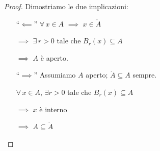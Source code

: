 \begin{proof} Dimostriamo le due implicazioni:

    \begin{itemize}
        \item [``$\impliedby$''] $ \forall\,x \in A $ $\implies$ $ x \in \mathring{A}$ 
        
        $\implies$ $ \exists\, r>0$ tale che $ B_{r}(x) \subseteq A$ 
        
        $\implies$ $ A $ è aperto.
        \item [``$\implies$''] Assumiamo $ A $ aperto; $ \mathring{A} \subseteq A $ sempre.
        
        $ \forall\, x \in A $, $ \exists r >0 $ tale che $ B_{r}(x) \subseteq A$ 
        
        $\implies$ $x$ è interno 
        
        $\implies$ $ A \subseteq \mathring{A} $\qedhere
    \end{itemize}
\end{proof}

